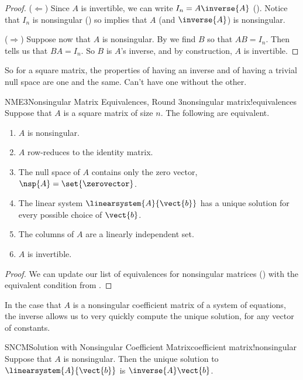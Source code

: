 %
\begin{proof}
($\Leftarrow$)  Since $A$ is invertible, we can write $I_n=A\inverse{A}$ ().  Notice that $I_n$ is nonsingular () so  implies that $A$ (and $\inverse{A}$) is nonsingular.\par
%
($\Rightarrow$)  Suppose now that $A$ is nonsingular.  By  we find $B$ so that $AB=I_n$.  Then  tells us that $BA=I_n$.  So $B$ is $A$'s inverse, and by construction, $A$ is invertible.
%
\end{proof}
%
So for a square matrix, the properties of having an inverse and of having a trivial null space are one and the same.  Can't have one without the other.  
%
\begin{theorem}{NME3}{Nonsingular Matrix Equivalences, Round 3}{nonsingular matrix!equivalences}
Suppose that $A$ is a square matrix of size $n$.  The following are equivalent.
%
\begin{enumerate}
\item $A$ is nonsingular.
\item $A$ row-reduces to the identity matrix.
\item The null space of $A$ contains only the zero vector, $\nsp{A}=\set{\zerovector}$.
\item The linear system $\linearsystem{A}{\vect{b}}$ has a unique solution for every possible choice of $\vect{b}$.
\item The columns of $A$ are a linearly independent set.
\item $A$ is invertible.
\end{enumerate}
\end{theorem}
%
\begin{proof}
We can update our list of equivalences for nonsingular matrices () with the equivalent condition from .
\end{proof}
%
In the case that $A$ is a nonsingular coefficient matrix of a system of equations, the inverse allows us to very quickly compute the unique solution, for any vector of constants.
%
\begin{theorem}{SNCM}{Solution with Nonsingular Coefficient Matrix}{coefficient matrix!nonsingular}
Suppose that $A$ is nonsingular.  Then the unique solution to $\linearsystem{A}{\vect{b}}$ is $\inverse{A}\vect{b}$.
\end{theorem}
%

